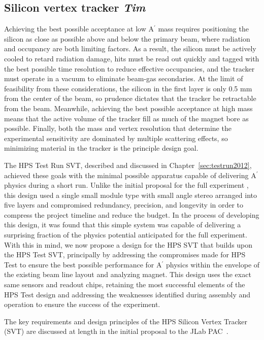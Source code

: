 \subsection{Silicon vertex tracker {\it Tim}}
\label{sec:svt}

Achieving the best possible acceptance at low A$^\prime$ mass requires positioning the silicon as close as possible above and below the primary beam, where radiation and occupancy are both limiting factors.  As a result, the silicon must be actively cooled to retard radiation damage, hits must be read out quickly and tagged with the best possible time resolution to reduce effective occupancies, and the tracker must operate in a vacuum to eliminate beam-gas secondaries.  At the limit of feasibility from these considerations, the silicon in the first layer is only 0.5 mm from the center of the beam, so prudence dictates that the tracker be retractable from the beam. Meanwhile, achieving the best possible acceptance at high mass means that the active volume of the tracker fill as much of the magnet bore as possible.  Finally, both the mass and vertex resolution that determine the experimental sensitivity are dominated by multiple scattering effects, so minimizing material in the tracker is the principle design goal.

The HPS Test Run SVT, described and discussed in Chapter~\ref{sec:testrun2012}, achieved these goals with the minimal possible apparatus capable of delivering A$^\prime$ physics during a short run. Unlike the initial proposal for the full experiment \cite{HPS_PROP}, this design used a single small module type with small angle stereo arranged into five layers and compromised redundancy, precision, and longevity in order to compress the project timeline and reduce the budget. In the process of developing this design, it was found that this simple system was capable of delivering a surprising fraction of the physics potential anticipated for the full experiment.  With this in mind, we now propose a design for the HPS SVT that builds upon the HPS Test  SVT, principally by addressing the compromises made for HPS Test to ensure the best possible performance for A$^\prime$ physics within the envelope of the existing beam line layout and analyzing magnet.  This design uses the exact same sensors and readout chips, retaining the most successful elements of the HPS Test design and addressing the weaknesses identified during assembly and operation to ensure the success of the experiment.


The key requirements and design principles of the HPS Silicon Vertex Tracker (SVT) are discussed at length in the initial proposal to the JLab PAC~\cite{HPS_PROP}.  

